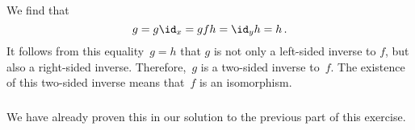 \subsection{}



\subsubsection{}
\label{if left and right invertible then isomorphism}

We find that
\[
	g = g \id_x = g f h = \id_y h = h \,.
\]
It follows from this equality~$g = h$ that $g$ is not only a left-sided inverse to $f$, but also a right-sided inverse.
Therefore,~$g$ is a two-sided inverse to~$f$.
The existence of this two-sided inverse means that~$f$ is an isomorphism.



\subsubsection{}

We have already proven this in our solution to the previous part of this exercise.

